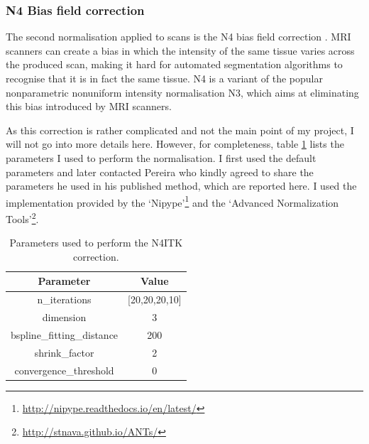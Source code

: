 \documentclass[12pt,a4paper,twoside,openright]{report}
\begin{document}
\subsubsection{N4 Bias field correction}
The second normalisation applied to scans is the N4 bias field correction \cite{n4itk}. MRI scanners can create a bias in which the intensity of the same tissue varies across the produced scan, making it hard for automated segmentation algorithms to recognise that it is in fact the same tissue. N4 is a variant of the popular nonparametric nonuniform intensity normalisation N3, which aims at eliminating this bias introduced by MRI scanners. 

As this correction is rather complicated and not the main point of my project, I will not go into more details here. However, for completeness, table \ref{table:n4_params} lists the parameters I used to perform the normalisation. I first used the default parameters and later contacted Pereira who kindly agreed to share the parameters he used in his published method, which are reported here. I used the implementation provided by the `Nipype'\footnote{\url{http://nipype.readthedocs.io/en/latest/}} and the `Advanced Normalization Tools'\footnote{\url{http://stnava.github.io/ANTs/}}.

\begin{table}[h]
\centering	
\begin{tabular}{ c c } 
\textbf{Parameter} & \textbf{Value} \\
 \hline
 n\_iterations & [20,20,20,10] \\ 
 dimension & 3 \\
 bspline\_fitting\_distance & 200 \\
 shrink\_factor & 2\\
 convergence\_threshold & 0
\end{tabular}
\caption{Parameters used to perform the N4ITK correction.}
\label{table:n4_params}
\end{table}
\end{document}
